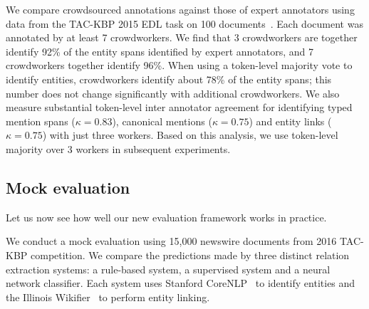 We compare crowdsourced annotations against those of expert annotators using data from the TAC-KBP 2015 EDL task on 100 documents~\citep{}.
Each document was annotated by at least 7 crowdworkers.
We find that 3 crowdworkers are together identify 92\% of the entity spans identified by expert annotators,
  and 7 crowdworkers together identify 96\%.
When using a token-level majority vote to identify entities, crowdworkers identify about 78\% of the entity spans; this number does not change significantly with additional crowdworkers.
We also measure substantial token-level inter annotator agreement for identifying typed mention spans ($\kappa = 0.83$), canonical mentions ($\kappa = 0.75$) and entity links ($\kappa = 0.75$) with just three workers.
Based on this analysis, we use token-level majority over 3 workers in subsequent experiments.

\subsection{Mock evaluation}
Let us now see how well our new evaluation framework works in practice.

We conduct a mock evaluation using 15,000 newswire documents from 2016 TAC-KBP competition.
We compare the predictions made by three distinct relation extraction systems: a rule-based system, a supervised system and a neural network classifier.
Each system uses Stanford CoreNLP~\citep{} to identify entities and the Illinois Wikifier~\citep{} to perform entity linking. 

